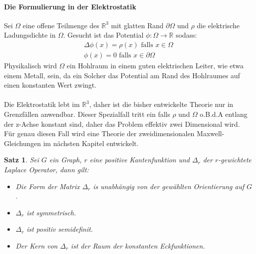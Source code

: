 \documentclass[11pt,a4paper,leqno]{report}
\newtheorem{proposition}{Satz}[chapter]
\numberwithin{equation}{chapter}
\begin{document}
\paragraph{Die Formulierung in der Elektrostatik} Sei $\Omega$ eine offene Teilmenge des $\mathbb{R}^3$ mit glatten Rand $\partial\Omega$ und $\rho$ die elektrische Ladungsdichte in $\Omega$. Gesucht ist das Potential $\phi:\Omega\rightarrow\mathbb{R}$ sodass:
\begin{align}
\Delta \phi(x) = \rho(x)\text{  falls } x\in \Omega\\
\phi(x) = 0\text{  falls } x\in \partial\Omega
\end{align}
Physikalisch wird $\Omega$ ein Hohlraum in einem guten elektrischen Leiter, wie etwa einem Metall, sein,  da ein Solcher das Potential am Rand des Hohlraumes auf einen konstanten Wert zwingt.\\
\\
Die Elektrostatik lebt im $\mathbb{R}^3$, daher ist die bisher entwickelte Theorie nur in Grenzf\"allen anwendbar. Dieser Spezialfall tritt ein falls $\rho$ und $\Omega$ o.B.d.A entlang der z-Achse konstant sind, daher das Problem effektiv zwei Dimensional wird. F\"ur genau diesen Fall wird eine Theorie der zweidimensionalen Maxwell-Gleichungen im n\"achsten Kapitel entwickelt. 
\begin{proposition}
	Sei $G$ ein  Graph, $r$ eine positive Kantenfunktion und $\Delta_r$ der $r$-gewichtete Laplace Operator, dann gilt:
	\begin{itemize}
		\item Die Form der Matrix $\Delta_r$ is unabh\"angig von der gew\"ahlten Orientierung auf $G$. 
		\item $\Delta_r$ ist symmetrisch.\\
		\item $\Delta_r$ ist positiv semidefinit.\\
		\item Der Kern von $\Delta_r$ ist der Raum der konstanten Eckfunktionen.
	\end{itemize}
\end{proposition}
\end{document}
